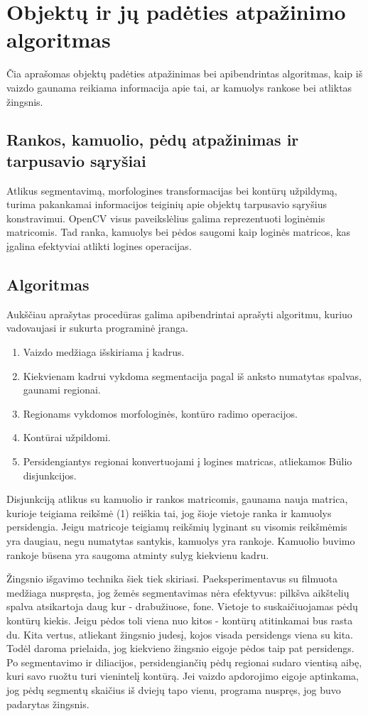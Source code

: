 \documentclass{VUMIFPSkursinis}
\begin{document}
\section{Objektų ir jų padėties atpažinimo algoritmas}
Čia aprašomas objektų padėties atpažinimas bei apibendrintas algoritmas, kaip iš vaizdo gaunama reikiama informacija apie tai, ar kamuolys rankose bei  atliktas žingsnis.
\subsection{Rankos, kamuolio, pėdų  atpažinimas ir tarpusavio sąryšiai}
Atlikus segmentavimą, morfologines transformacijas bei kontūrų užpildymą, turima pakankamai informacijos teiginių apie objektų tarpusavio sąryšius konstravimui.
OpenCV visus paveikslėlius galima reprezentuoti loginėmis matricomis. Tad ranka, kamuolys bei pėdos saugomi kaip loginės matricos, kas įgalina efektyviai atlikti logines operacijas.
\subsection{Algoritmas}
Aukščiau aprašytas procedūras galima apibendrintai aprašyti algoritmu, kuriuo vadovaujasi ir sukurta programinė įranga.
\begin{enumerate}
	\item Vaizdo medžiaga išskiriama į kadrus.  
	\item Kiekvienam kadrui vykdoma segmentacija pagal iš anksto numatytas spalvas, gaunami regionai. 
	\item Regionams vykdomos morfologinės, kontūro radimo operacijos.
	\item Kontūrai užpildomi.
	\item Persidengiantys regionai konvertuojami į logines matricas, atliekamos Būlio disjunkcijos.
\end{enumerate}

Disjunkciją atlikus su kamuolio ir rankos matricomis, gaunama nauja matrica, kurioje teigiama reikšmė (1) reiškia tai, jog šioje vietoje ranka ir kamuolys persidengia. Jeigu matricoje teigiamų reikšmių lyginant su visomis reikšmėmis yra daugiau, negu numatytas santykis, kamuolys yra rankoje. Kamuolio buvimo rankoje būsena yra saugoma atminty sulyg kiekvienu kadru.


Žingsnio išgavimo technika šiek tiek skiriasi. Paeksperimentavus su filmuota medžiaga nuspręsta, jog žemės segmentavimas nėra efektyvus: pilkšva aikštelių spalva atsikartoja daug kur - drabužiuose, fone. Vietoje to suskaičiuojamas pėdų kontūrų kiekis. Jeigu pėdos toli viena nuo kitos - kontūrų atitinkamai bus rasta du. Kita vertus, atliekant žingsnio judesį, kojos visada persidengs viena su kita. Todėl daroma prielaida, jog kiekvieno žingsnio eigoje pėdos taip pat persidengs. Po segmentavimo ir diliacijos, persidengiančių pėdų regionai sudaro vientisą aibę, kuri savo ruožtu turi vienintelį kontūrą. Jei vaizdo apdorojimo eigoje aptinkama, jog pėdų segmentų skaičius iš dviejų tapo vienu, programa nuspręs, jog buvo padarytas žingsnis. 
\end{document}
